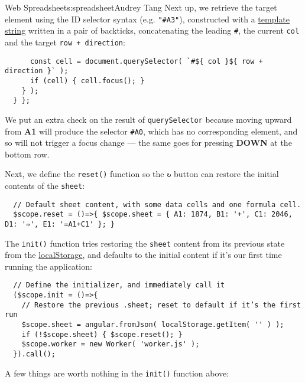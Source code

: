 \begin{aosachapter}{Web Spreadsheet}{s:spreadsheet}{Audrey Tang}
Next up, we retrieve the target element using the ID selector syntax
(e.g. \texttt{"\#A3"}), constructed with a
\href{https://developer.mozilla.org/en-US/docs/Web/JavaScript/Reference/template_strings}{template
string} written in a pair of backticks, concatenating the leading
\texttt{\#}, the current \texttt{col} and the target
\texttt{row + direction}:

\begin{verbatim}
      const cell = document.querySelector( `#${ col }${ row + direction }` );
      if (cell) { cell.focus(); }
    } );
  } };
\end{verbatim}

We put an extra check on the result of \texttt{querySelector} because
moving upward from \textbf{A1} will produce the selector \texttt{\#A0},
which has no corresponding element, and so will not trigger a focus
change --- the same goes for pressing \textbf{DOWN} at the bottom row.

Next, we define the \texttt{reset()} function so the \texttt{↻} button
can restore the initial contents of the \texttt{sheet}:

\begin{verbatim}
  // Default sheet content, with some data cells and one formula cell.
  $scope.reset = ()=>{ $scope.sheet = { A1: 1874, B1: '+', C1: 2046, D1: '⇒', E1: '=A1+C1' }; }
\end{verbatim}

The \texttt{init()} function tries restoring the \texttt{sheet} content
from its previous state from the
\href{https://developer.mozilla.org/en-US/docs/Web/Guide/API/DOM/Storage\#localStorage}{localStorage},
and defaults to the initial content if it's our first time running the
application:

\begin{verbatim}
  // Define the initializer, and immediately call it
  ($scope.init = ()=>{
    // Restore the previous .sheet; reset to default if it’s the first run
    $scope.sheet = angular.fromJson( localStorage.getItem( '' ) );
    if (!$scope.sheet) { $scope.reset(); }
    $scope.worker = new Worker( 'worker.js' );
  }).call();
\end{verbatim}

A few things are worth nothing in the \texttt{init()} function above:

\begin{aosaitemize}


\end{aosaitemize}
\end{aosachapter}
